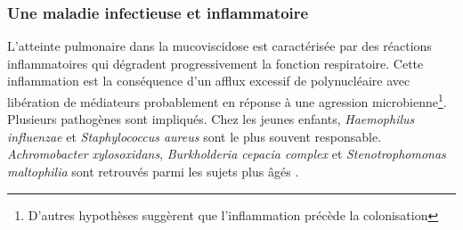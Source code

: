 \documentclass[12pt,a4paper]{article}
\begin{document}
\subsubsection{Une maladie infectieuse et inflammatoire}

L’atteinte pulmonaire dans la mucoviscidose est caractérisée par des réactions inflammatoires qui dégradent progressivement la fonction respiratoire. Cette inflammation est la conséquence d'un afflux excessif de polynucléaire avec libération de médiateurs\cite{Heijerman2005} probablement en réponse à une agression microbienne\footnote{D'autres hypothèses suggèrent que l'inflammation précède la colonisation\cite{Heijerman2005}}. Plusieurs pathogènes sont impliqués. Chez les jeunes enfants\cite{Davies}, \textit{Haemophilus influenzae} et \textit{Staphylococcus aureus} sont le plus souvent responsable. \textit{Achromobacter xylosoxidans}, \textit{Burkholderia cepacia complex} et \textit{Stenotrophomonas maltophilia} sont retrouvés parmi les sujets plus âgés \cite{Davies}.
\end{document}

